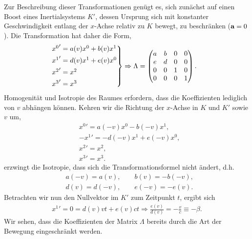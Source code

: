 Zur Beschreibung dieser Transformationen genügt es, sich zunächst auf einen
Boost eines Inertialsystems $K'$, dessen Ursprung sich mit konstanter
Geschwindigkeit entlang der $x$-Achse relativ zu $K$ bewegt, zu beschränken
($\bm{\mathrm{a}}=0$). Die Transformation hat daher die Form,
\begin{align*}
&\begin{rcases}
{x^0}' = a(v)x^0 + b(v)x^1\\
{x^1}' = d(v)x^1 + e(v)x^0\\
{x^2}' = x^2\\
{x^3}' = x^3
\end{rcases}
\Rightarrow\Lambda =
\begin{pmatrix}
a & b & 0 & 0\\
e & d & 0 & 0\\
0 & 0 & 1 & 0\\
0 & 0 & 0 & 1
\end{pmatrix}.
\end{align*}
Homogenität und Isotropie des Raumes erfordern, dass die Koeffizienten
lediglich von $v$ abhängen können. Kehren wir die Richtung der $x$-Achse in $K$
und $K'$ sowie $v$ um,
\begin{align*}
&{x^0}' = a(-v)x^0 - b(-v)x^1,\\
&-{x^1}' = -d(-v)x^1 + e(-v)x^0,\\
&{x^2}' = x^2,\\
&{x^3}' = x^3.
\end{align*}
 erzwingt die Isotropie, dass sich die
Transformationsformel nicht ändert, d.h.
\begin{align*}
&a(-v) = a(v),\qquad b(v) = -b(-v),\\
&d(v) = d(-v),\qquad e(-v) = -e(v).
\end{align*}
Betrachten wir nun den Nullvektor im $K'$ zum Zeitpunkt $t$, ergibt sich
\begin{align*}
{x^1}' = 0 = d(v)vt + e(v)ct \Rightarrow \frac{e(v)}{d(v)} = -\frac{v}{c} \equiv
-\beta.
\end{align*}
Wir sehen, dass die Koeffizienten der Matrix $\Lambda$ bereits durch die Art
der Bewegung eingeschränkt werden.

